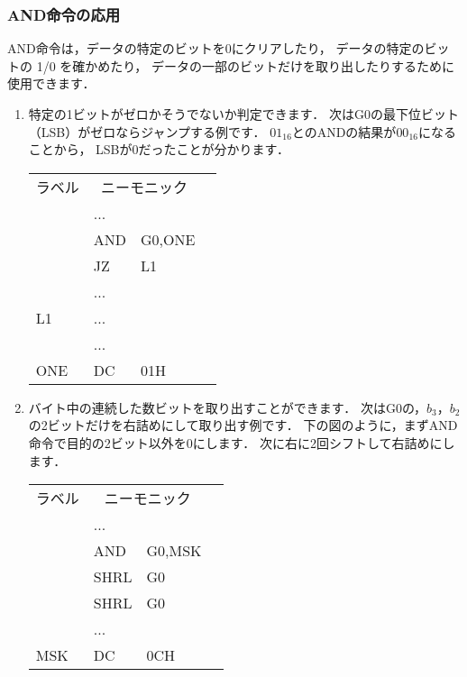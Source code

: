 \subsubsection{AND命令の応用}
AND命令は，データの特定のビットを0にクリアしたり，
データの特定のビットの 1/0 を確かめたり，
データの一部のビットだけを取り出したりするために使用できます．

\begin{enumerate}
\item 特定の1ビットがゼロかそうでないか判定できます．
次はG0の最下位ビット（LSB）がゼロならジャンプする例です．
$01_{16}$とのANDの結果が$00_{16}$になることから，
LSBが$0$だったことが分かります．

{\small\tt\begin{center}
\begin{tabular}{|l|l l|l}
\cline{1-3}
ラベル & \multicolumn{2}{|c|}{ニーモニック} & \\
\cline{1-3}
    & ...  &        & \\
    & AND  & G0,ONE & \\
    & JZ   & L1     & \\
    & ...  &        & \\
L1  & ...  &        & \\
    & ...  &        & \\
ONE & DC   & 01H    & \\
\cline{1-3}
\end{tabular}
\end{center}}

\item バイト中の連続した数ビットを取り出すことができます．
次はG0の，$b_3$，$b_2$の2ビットだけを右詰めにして取り出す例です．
下の図のように，まずAND命令で目的の2ビット以外を0にします．
次に右に2回シフトして右詰めにします．

{\small\tt\begin{center}
\begin{tabular}{|l|l l|l}
\cline{1-3}
ラベル & \multicolumn{2}{|c|}{ニーモニック} & \\
\cline{1-3}
    & ...  &        & \\
    & AND  & G0,MSK & \\
    & SHRL & G0     & \\
    & SHRL & G0     & \\
    & ...  &        & \\
MSK & DC   & 0CH    & \\
\cline{1-3}
\end{tabular}
\end{center}}


\end{enumerate}
